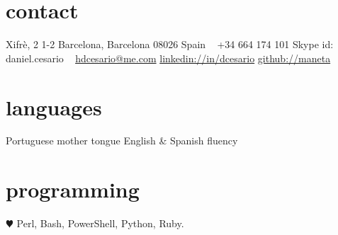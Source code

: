 \documentclass[]{friggeri-cv} %
\begin{document}


\begin{aside} %
\section{contact}
Xifrè, 2 1-2
Barcelona, Barcelona 08026
Spain
~
+34 664 174 101
Skype id: daniel.cesario
~
\href{mailto:hdcesario@me.com}{hdcesario@me.com}
\href{http://es.linkedin.com/in/dcesario/}{linkedin://in/dcesario}
\href{https://github.com/maneta}{github://maneta}
\section{languages}
Portuguese mother tongue
English \& Spanish fluency
\section{programming}
{\color{red} $\varheartsuit$} Perl, Bash, PowerShell, Python, Ruby. 
\end{aside}

\end{document}
